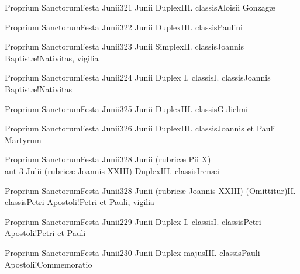 \documentclass[psalterium-feriale.tex]{subfiles}
\begin{document}
	{Proprium Sanctorum}{Festa Junii}{3}{21 Junii}
	{Duplex}{III. classis}{Aloisii Gonzagæ}
	{}
	{}
\COPObRubric

	{Proprium Sanctorum}{Festa Junii}{3}{22 Junii}
	{Duplex}{III. classis}{Paulini}
	{}
	{}
\COPObRubric

	{Proprium Sanctorum}{Festa Junii}{3}{23 Junii}
	{Simplex}{II. classis}{Joannis Baptistæ!Nativitas, vigilia}
	{}
	{}
\feriaRubric

	{Proprium Sanctorum}{Festa Junii}{2}{24 Junii}
	{Duplex I. classis}{I. classis}{Joannis Baptistæ!Nativitas}
	{}
	{}
\psalmodiapropria


	{Proprium Sanctorum}{Festa Junii}{3}{25 Junii}
	{Duplex}{III. classis}{Gulielmi}
	{}
	{}
\COPObRubric

	{Proprium Sanctorum}{Festa Junii}{3}{26 Junii}
	{Duplex}{III. classis}{Joannis et Pauli Martyrum}
	{}
	{}
\PMEXbRubric

	{Proprium Sanctorum}{Festa Junii}{3}{28 Junii (rubricæ Pii X)\\aut 3 Julii (rubricæ Joannis XXIII)}
	{Duplex}{III. classis}{Irenæi}
	{}
	{}
\UMEXcRubric

	{Proprium Sanctorum}{Festa Junii}{3}{28 Junii (rubricæ Joannis XXIII)}
	{(Omittitur)}{II. classis}{Petri Apostoli!Petri et Pauli, vigilia}
	{}
	{}
\feriaRubric

	{Proprium Sanctorum}{Festa Junii}{2}{29 Junii}
	{Duplex I. classis}{I. classis}{Petri Apostoli!Petri et Pauli}
	{}
	{}
\psalmodiapropria


	{Proprium Sanctorum}{Festa Junii}{2}{30 Junii}
	{Duplex majus}{III. classis}{Pauli Apostoli!Commemoratio}
	{}
	{}
\psalmodiapropria
\end{document}
